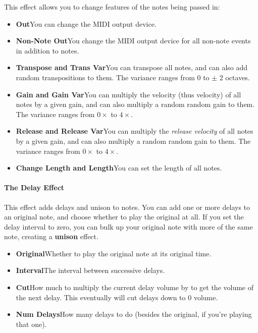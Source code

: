 \documentclass[twoside,10pt]{article}
\begin{document}
This effect allows you to change features of the notes being passed in:

\begin{itemize}
\item {\bf Out}\qquad You can change the MIDI output device.
\item {\bf Non-Note Out}\qquad You change the MIDI output device for all non-note events in addition to notes.
\item {\bf Transpose and Trans Var}\qquad You can transpose all notes, and can also add random transpositions to them.  The variance ranges from \(0\) to \(\pm\) 2 octaves.
\item {\bf Gain and Gain Var}\qquad You can multiply the velocity (thus velocity) of all notes by a given gain, and can also multiply a random random gain to them.  The variance ranges from \(0\times\) to \(4\times\).
\item {\bf Release and Release Var}\qquad You can multiply the {\it release velocity} of all notes by a given gain, and can also multiply a random random gain to them.  The variance ranges from \(0\times\) to \(4\times\).
\item {\bf Change Length and Length}\qquad You can set the length of all notes.
\end{itemize}

\paragraph{The Delay Effect}

This effect adds delays and unison to notes.  You can add one or more delays to an original note, and choose whether to play the original at all.  If you set the delay interval to zero, you can bulk up your original note with more of the same note, creating a {\bf unison} effect.

\begin{itemize}
\item {\bf Original}\qquad Whether to play the original note at its original time.
\item {\bf Interval}\qquad The interval between successive delays. 
\item {\bf Cut}\qquad How much to multiply the current delay volume by to get the volume of the next delay.  This eventually will cut delays down to 0 volume.
\item {\bf Num Delays}\qquad How many delays to do (besides the original, if you're playing that one).
\end{itemize}
\end{document}
